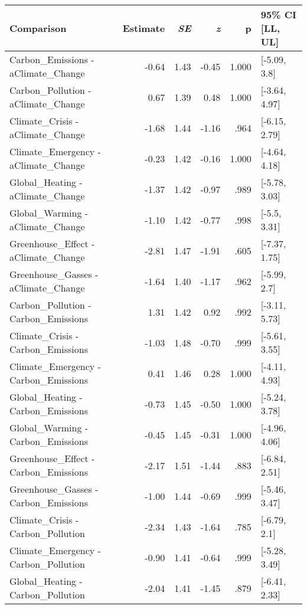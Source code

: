 \begin{table}[ht]
\centering
\begin{tabular}{lrrrrl}
  \hline
Comparison & Estimate & \textit{SE} & \textit{z} & p & 95\% CI [LL, UL] \\ 
  \hline
Carbon\_Emissions - aClimate\_Change & -0.64 & 1.43 & -0.45 & 1.000 & [-5.09, 3.8] \\ 
  Carbon\_Pollution - aClimate\_Change & 0.67 & 1.39 & 0.48 & 1.000 & [-3.64, 4.97] \\ 
  Climate\_Crisis - aClimate\_Change & -1.68 & 1.44 & -1.16 & .964 & [-6.15, 2.79] \\ 
  Climate\_Emergency - aClimate\_Change & -0.23 & 1.42 & -0.16 & 1.000 & [-4.64, 4.18] \\ 
  Global\_Heating - aClimate\_Change & -1.37 & 1.42 & -0.97 & .989 & [-5.78, 3.03] \\ 
  Global\_Warming - aClimate\_Change & -1.10 & 1.42 & -0.77 & .998 & [-5.5, 3.31] \\ 
  Greenhouse\_Effect - aClimate\_Change & -2.81 & 1.47 & -1.91 & .605 & [-7.37, 1.75] \\ 
  Greenhouse\_Gasses - aClimate\_Change & -1.64 & 1.40 & -1.17 & .962 & [-5.99, 2.7] \\ 
  Carbon\_Pollution - Carbon\_Emissions & 1.31 & 1.42 & 0.92 & .992 & [-3.11, 5.73] \\ 
  Climate\_Crisis - Carbon\_Emissions & -1.03 & 1.48 & -0.70 & .999 & [-5.61, 3.55] \\ 
  Climate\_Emergency - Carbon\_Emissions & 0.41 & 1.46 & 0.28 & 1.000 & [-4.11, 4.93] \\ 
  Global\_Heating - Carbon\_Emissions & -0.73 & 1.45 & -0.50 & 1.000 & [-5.24, 3.78] \\ 
  Global\_Warming - Carbon\_Emissions & -0.45 & 1.45 & -0.31 & 1.000 & [-4.96, 4.06] \\ 
  Greenhouse\_Effect - Carbon\_Emissions & -2.17 & 1.51 & -1.44 & .883 & [-6.84, 2.51] \\ 
  Greenhouse\_Gasses - Carbon\_Emissions & -1.00 & 1.44 & -0.69 & .999 & [-5.46, 3.47] \\ 
  Climate\_Crisis - Carbon\_Pollution & -2.34 & 1.43 & -1.64 & .785 & [-6.79, 2.1] \\ 
  Climate\_Emergency - Carbon\_Pollution & -0.90 & 1.41 & -0.64 & .999 & [-5.28, 3.49] \\ 
  Global\_Heating - Carbon\_Pollution & -2.04 & 1.41 & -1.45 & .879 & [-6.41, 2.33] \\ 

\end{tabular}
\end{table}
